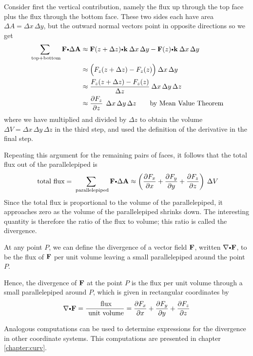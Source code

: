 Consider first the vertical contribution, namely the flux up through the top face plus the flux  through the bottom face.
These two sides each have area  $\Delta A=\Delta x\,\Delta y$, but the outward normal vectors point in opposite directions
so we get
\begin{align*} \sum_{\text{ top+bottom}}  \vector{F} \bp \Delta \vector{A}    &\approx\vector{F}(z+\Delta z) \bp \vector{k}\> \Delta x\,\Delta y - \vector{F}(z) \bp\vector{k}\> \Delta x\,\Delta y \\ 
& \approx \Bigl( F_z(z+\Delta z) - F_z(z) \Bigr) \> \Delta x\,\Delta y \\ 
 &\approx \dfrac{F_z(z+\Delta z) - F_z(z)}{\Delta z} \> \Delta x\,\Delta y\,\Delta z  \\ 
 &\approx \Dh{F_z}{z} \>\> \Delta x\,\Delta y\,\Delta z \qquad\text{by Mean Value Theorem}
\end{align*}
where we have multiplied and divided by $\Delta z$ to obtain the volume  $\Delta V=\Delta x\,\Delta y\,\Delta z$ in the third step, and used the definition of the derivative in the final step.

Repeating this argument for the  remaining pairs of faces, it follows that the total flux out of the parallelepiped is
\begin{eqnarray*} {\text{ total flux}}  = \sum_\text{ parallelepiped} \vector{F} \bp \Delta \vector{A}  \approx \left( \Dh{F_x}{x} + \Dh{F_y}{y} + \Dh{F_z}{z} \right)  \> \Delta V \end{eqnarray*}
Since the total flux is proportional to the volume of the parallelepiped, it approaches zero as the volume of the  parallelepiped shrinks down. The interesting quantity is therefore the ratio of the flux to volume; this ratio is called the divergence.

At any point $P$, we can define the divergence of a vector field $\mathbf{ F}$, written $\grad\bp\vector{F}$, to be the flux of $\mathbf{ F}$ per unit volume leaving a small parallelepiped around the point  $P$. 

Hence, the divergence of $\mathbf{ F}$ at the point $P$ is the flux per unit volume through a small parallelepiped around $P$, which is given in rectangular coordinates by
\begin{eqnarray*} \grad\bp\vector{F}   = \dfrac{\text{ flux}}{\text{ unit\ volume}}   = \Dh{F_x}{x} + \Dh{F_y}{y} + \Dh{F_z}{z} \end{eqnarray*}


Analogous computations can be used to determine expressions for the divergence in other coordinate systems. This computations are presented in chapter 
\ref{chapter:curv}.
  
